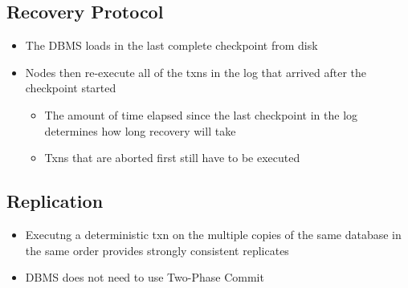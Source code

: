 \documentclass[11pt]{article}
\begin{document}
    \subsection*{Recovery Protocol}
    \begin{itemize}
        \item The DBMS loads in the last complete checkpoint from disk
        \item Nodes then re-execute all of the txns in the log that arrived after the checkpoint started
        \begin{itemize}
            \item The amount of time elapsed since the last checkpoint in the log determines how long recovery will take
            \item Txns that are aborted first still have to be executed
        \end{itemize}
    \end{itemize}

    \subsection*{Replication}
    \begin{itemize}
        \item Executng a deterministic txn on the multiple copies of the same database in the same order provides strongly consistent replicates
        \item DBMS does not need to use Two-Phase Commit
    \end{itemize}





















\newpage


\end{document}
